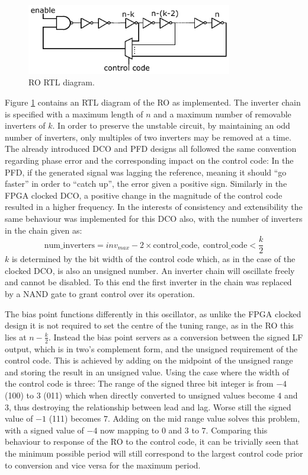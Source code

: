 \begin{figure}[h]
	\centering
	\includegraphics[width=0.8\textwidth]{../ro_new}
	\caption[\acl{RO} RTL diagram]{\acl{RO} RTL diagram.}
	\label{fig:ro_impl}
\end{figure}
Figure \ref{fig:ro_impl} contains an \ac{RTL} diagram of the \ac{RO} as implemented. The inverter chain is specified with a maximum length of $n$ and a maximum number of removable inverters of $k$. In order to preserve the unstable circuit, by maintaining an odd number of inverters, only multiples of two inverters may be removed at a time. The already introduced \ac{DCO} and \ac{PFD} designs all followed the same convention regarding phase error and the corresponding impact on the control code: In the \ac{PFD}, if the generated signal was lagging the reference, meaning it should ``go faster'' in order to ``catch up'', the error given a positive sign. Similarly in the \ac{FPGA} clocked \ac{DCO}, a positive change in the magnitude of the control code resulted in a higher frequency. In the interests of consistency and extensibility the same behaviour was implemented for this \ac{DCO} also, with the number of inverters in the chain given as:
\begin{equation}
\text{num\_inverters} = inv_{max} - 2\times\text{control\_code},~\text{control\_code}<\frac{k}{2}
\end{equation}
$k$ is determined by the bit width of the control code which, as in the case of the clocked \ac{DCO}, is also an unsigned number. An inverter chain will oscillate freely and cannot be disabled. To this end the first inverter in the chain was replaced by a \ac{NAND} gate to grant control over its operation.

The bias point functions differently in this oscillator, as unlike the \ac{FPGA} clocked design it is not required to set the centre of the tuning range, as in the \ac{RO} this lies at $n-\frac{k}{2}$. Instead the bias point servers as a conversion between the signed \ac{LF} output, which is in two's complement form, and the unsigned requirement of the control code. This is achieved by adding on the midpoint of the unsigned range and storing the result in an unsigned value. Using the case where the width of the control code is three: The range of the signed three bit integer is from $-4$ (100) to $3$ (011) which when directly converted to unsigned values become $4$ and $3$, thus destroying the relationship between lead and lag. Worse still the signed value of $-1$ (111) becomes $7$. Adding on the mid range value solves this problem, with a signed value of $-4$ now mapping to $0$ and $3$ to $7$. Comparing this behaviour to response of the \ac{RO} to the control code, it can be trivially seen that the minimum possible period will still correspond to the largest control code prior to conversion and vice versa for the maximum period.

